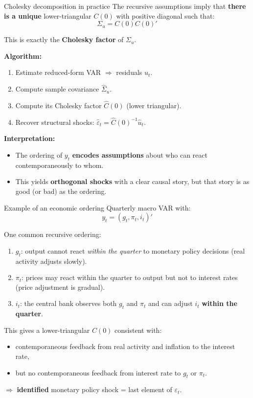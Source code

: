 \documentclass{beamer}
\begin{document}
\begin{frame}{Cholesky decomposition in practice}
\small
The recursive assumptions imply that \textbf{there is a unique} lower-triangular
$C(0)$ with positive diagonal such that:
\[
\Sigma_u = C(0) C(0)'
\]

\medskip
This is exactly the \textbf{Cholesky factor} of $\Sigma_u$.

\medskip
\textbf{Algorithm:}
\begin{enumerate}
  \item Estimate reduced-form VAR $\Rightarrow$ residuals $\hat u_t$.
  \item Compute sample covariance $\hat\Sigma_u$.
  \item Compute its Cholesky factor $\hat C(0)$ (lower triangular).
  \item Recover structural shocks: $\hat\varepsilon_t = \hat C(0)^{-1} \hat u_t$.
\end{enumerate}

\medskip
\textbf{Interpretation:}
\begin{itemize}
  \item The ordering of $y_t$ \textbf{encodes assumptions} about who can react
        contemporaneously to whom.
  \item This yields \textbf{orthogonal shocks} with a clear causal story,
        but that story is as good (or bad) as the ordering.
\end{itemize}
\end{frame}

\begin{frame}{Example of an economic ordering}
\small
Quarterly macro VAR with:
\[
y_t = (g_t, \pi_t, i_t)'
\]

One common recursive ordering:
\begin{enumerate}
  \item $g_t$: output cannot react \emph{within the quarter} to monetary policy decisions
        (real activity adjusts slowly).
  \item $\pi_t$: prices may react within the quarter to output but not to interest rates
        (price adjustment is gradual).
  \item $i_t$: the central bank observes both $g_t$ and $\pi_t$ and can adjust $i_t$
        \textbf{within the quarter}.
\end{enumerate}

\medskip
This gives a lower-triangular $C(0)$ consistent with:
\begin{itemize}
  \item contemporaneous feedback from real activity and inflation to
        the interest rate,
  \item but no contemporaneous feedback from interest rate to $g_t$ or $\pi_t$.
\end{itemize}

\medskip
$\Rightarrow$ \textbf{identified} monetary policy shock = last element of $\varepsilon_{t}$.
\end{frame}
\end{document}
